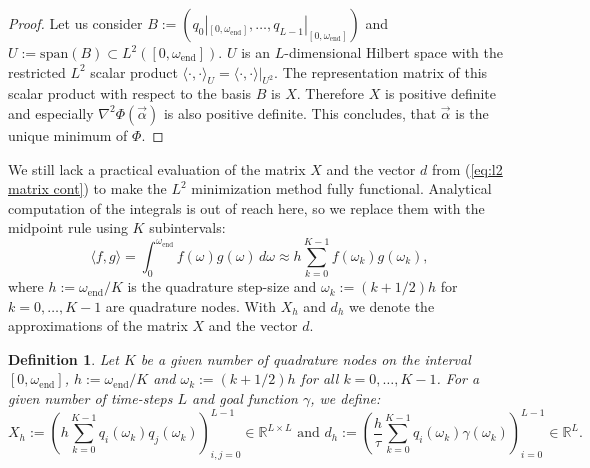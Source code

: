 \documentclass[a4paper,11pt,bibliography=totoc,listof=totoc,headinclude=true,cleardoublepage=empty,oneside]{scrbook}
\newtheorem{definition}[theorem]{Definition}
\newcommand{\R}{\mathbb{R}}
\newcommand{\e}{\mathrm{end}}
\renewcommand{\eqref}[1]{(\ref{#1})}
\begin{document}
\begin{proof}
    Let us consider $B:=\left(q_0|_{[0, \omega_\e]}, \dots, q_{L-1}|_{[0, \omega_\e]}\right)$ and $U := \mathrm{span}(B) \subset L^2\left([0, \omega_\e]\right)$. $U$ is an $L$-dimensional Hilbert space with the restricted $L^2$ scalar product $\langle \cdot, \cdot \rangle_U = \langle \cdot , \cdot \rangle|_{U^2}$. The representation matrix of this scalar product with respect to the basis $B$ is $X$. Therefore $X$ is positive definite and especially $\nabla^2\Phi(\Vec{\alpha})$ is also positive definite. This concludes, that $\Vec{\alpha}$ is the unique minimum of $\Phi$. 
\end{proof}

We still lack a practical evaluation of the matrix $X$ and the vector $d$ from \eqref{eq:l2 matrix cont} to make the $L^2$ minimization method fully functional. Analytical computation of the integrals is out of reach here, so we replace them with the midpoint rule using $K$ subintervals:
\begin{equation*}
    \langle f, g \rangle = \int_0^{\omega_\e} f(\omega) g(\omega) \, d\omega \approx h \sum_{k=0}^{K-1} f(\omega_k)g(\omega_k), 
\end{equation*}
where $h := \omega_\e/K$ is the quadrature step-size and $\omega_k := (k+1/2)h$ for $k = 0, \dots, K-1$ are quadrature nodes. With $X_h$ and $d_h$ we denote the approximations of the matrix $X$ and the vector $d$.

\begin{definition}\label{def:Xh}
    Let $K$ be a given number of quadrature nodes on the interval $[0, \omega_\e]$, $h := \omega_\e/K$ and $\omega_k := (k+1/2)h$ for all $k = 0, \dots, K-1$. For a given number of time-steps $L$ and goal function $\gamma$, we define:
    \begin{equation*}
        X_h := \left(h\sum_{k=0}^{K-1} q_i(\omega_k)q_j(\omega_k)\right)_{i,j = 0}^{L-1} \in \R^{L\times L} \text{ and } d_h := \left(\frac{h}{\tau}\sum_{k=0}^{K-1} q_i(\omega_k)\gamma(\omega_k) \right)_{i=0}^{L-1} \in \R^L.
    \end{equation*}
\end{definition}
\end{document}
